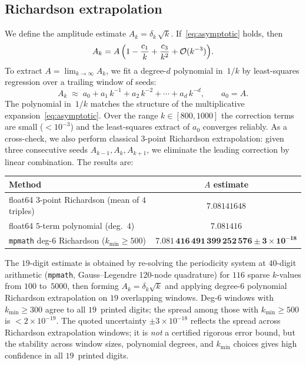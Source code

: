 \documentclass[11pt,a4paper]{article}
\theoremstyle{plain}
\theoremstyle{definition}
\theoremstyle{remark}
\newcommand{\Oo}{\mathcal{O}}
\begin{document}
\subsection{Richardson extrapolation}\label{sec:richardson}
We define the amplitude estimate
$A_k = \delta_k\,\sqrt{k}$.  If~\eqref{eq:asymptotic} holds, then
\[
  A_k = A\,\Bigl(1 - \frac{c_1}{k} + \frac{c_3}{k^2}
    + \Oo(k^{-3})\Bigr).
\]
To extract $A = \lim_{k\to\infty} A_k$, we fit a degree-$d$
polynomial in~$1/k$ by least-squares regression over a trailing
window of seeds:
\begin{equation}
  A_k \;\approx\; a_0 + a_1\,k^{-1} + a_2\,k^{-2}
    + \cdots + a_d\,k^{-d},
  \qquad a_0 = A.
  \label{eq:richardson-poly}
\end{equation}
The polynomial in~$1/k$ matches the structure of the multiplicative
expansion~\eqref{eq:asymptotic}.  Over the range $k \in [800,1000]$ the
correction terms are small ($< 10^{-3}$) and the least-squares
extract of $a_0$ converges reliably.  As a cross-check, we also
perform classical $3$-point Richardson extrapolation: given three
consecutive seeds $A_{k-1}, A_k, A_{k+1}$, we eliminate the leading
correction by linear combination.  The results are:

\begin{center}
\begin{tabular}{@{}lc@{}}
\toprule
Method & $A$ estimate \\
\midrule
float64 $3$-point Richardson (mean of $4$ triples) & $7.08141648$ \\
float64 $5$-term polynomial (deg.~$4$)             & $7.081416$ \\
\texttt{mpmath} deg-$6$ Richardson ($k_{\min} \geq 500$)
  & $\mathbf{7.081\,416\,491\,399\,252\,576 \pm 3\times 10^{-18}}$ \\
\bottomrule
\end{tabular}
\end{center}

\noindent
The $19$-digit estimate is obtained by re-solving the periodicity
system at $40$-digit arithmetic (\texttt{mpmath},
Gauss--Legendre $120$-node quadrature) for $116$ sparse
$k$-values from $100$ to~$5000$, then forming
$A_k = \delta_k\sqrt{k}$ and applying degree-$6$ polynomial
Richardson extrapolation on $19$ overlapping windows.
Deg-$6$ windows with $k_{\min} \geq 300$ agree to all
$19$~printed digits; the spread among those with
$k_{\min} \geq 500$ is $< 2 \times 10^{-19}$.
The quoted uncertainty $\pm 3 \times 10^{-18}$ reflects the
spread across Richardson extrapolation windows; it is
\emph{not} a certified rigorous error bound, but the stability
across window sizes, polynomial degrees, and $k_{\min}$
choices gives high confidence in all $19$~printed digits.
\end{document}
